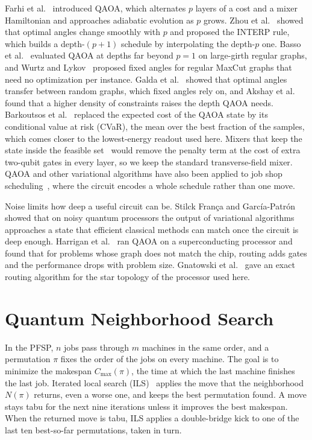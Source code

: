 \documentclass[runningheads]{llncs}
\begin{document}
Farhi et al.~\cite{farhi2014qaoa} introduced QAOA, which alternates $p$ layers of a cost and a
mixer Hamiltonian and approaches adiabatic evolution as $p$ grows. Zhou et
al.~\cite{zhou2020} showed that optimal angles change smoothly with $p$ and
proposed the INTERP rule, which builds a depth-$(p+1)$ schedule by
interpolating the depth-$p$ one. Basso et al.~\cite{basso2022} evaluated
QAOA at depths far beyond $p = 1$ on large-girth regular graphs, and Wurtz
and Lykov~\cite{wurtz2021fixed} proposed fixed angles for regular MaxCut
graphs that need no optimization per instance. Galda et
al.~\cite{galda2021} showed that optimal angles transfer between random
graphs, which fixed angles rely on, and Akshay et al.~\cite{akshay2020} found
that a higher density of constraints raises the depth QAOA needs. Barkoutsos
et al.~\cite{barkoutsos2020cvar} replaced the expected cost of the QAOA state
by its conditional value at risk (CVaR), the mean over the best fraction of
the samples, which comes closer to the lowest-energy readout used here.
Mixers that keep the state inside the feasible set~\cite{hadfield2019} would
remove the penalty term at the cost of extra two-qubit gates in every layer,
so we keep the standard transverse-field mixer. QAOA and other variational algorithms have also been
applied to job shop scheduling~\cite{kurowski2023,amaro2022}, where the
circuit encodes a whole schedule rather than one move.

Noise limits how deep a useful circuit can be. Stilck Fran\c{c}a and
Garc\'{i}a-Patr\'{o}n~\cite{franca2021} showed that on noisy quantum processors the
output of variational algorithms approaches a state that efficient classical
methods can match once the circuit is deep enough. Harrigan et
al.~\cite{harrigan2021} ran QAOA on a superconducting processor and found
that for problems whose graph does not match the chip, routing adds gates and
the performance drops with problem size. Gnatowski et
al.~\cite{gnatowski2026routing} gave an exact routing algorithm for the star
topology of the processor used here.

\section{Quantum Neighborhood Search}

In the PFSP, $n$ jobs pass through $m$
machines in the same order, and a permutation $\pi$ fixes the order of the
jobs on every machine. The goal is to minimize the makespan
$C_{\max}(\pi)$, the time at which the last machine finishes the last job.
Iterated local search (ILS)~\cite{lourenco2003} applies the move that the
neighborhood $N(\pi)$ returns, even a worse one, and keeps the best
permutation found. A move stays tabu for the next nine iterations unless it
improves the best makespan. When the returned move is tabu, ILS applies a
double-bridge kick to one of the last ten best-so-far permutations, taken in
turn.
\end{document}
